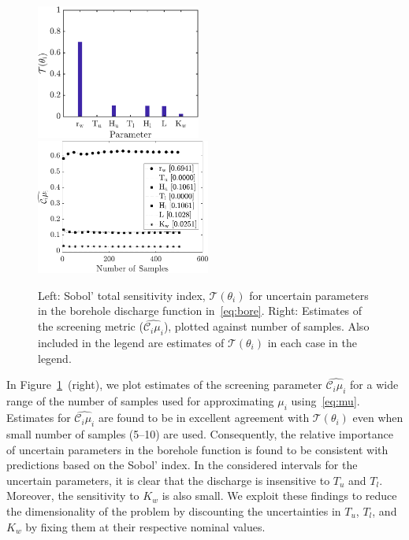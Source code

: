 \begin{figure}[htbp]
 \begin{center}
  \includegraphics[width=0.48\textwidth]{./Figures/sense_borehole}
  \includegraphics[width=0.51\textwidth]{./Figures/ub_conv_borehole}
\caption{
Left: Sobol' total sensitivity index, $\mathcal{T}(\theta_i)$ for uncertain
parameters in the
borehole discharge function in~\eqref{eq:bore}. Right: 
Estimates of the screening metric ($\widehat{\mathcal{C}_i\mu_i}$), plotted
against number of samples. Also included in the legend are estimates of
$\mathcal{T}(\theta_i)$ in each case in the legend.}
\label{fig:sense_bore}
\end{center}
\end{figure}

In Figure~\ref{fig:sense_bore}~(right), we plot estimates of the screening parameter 
$\widehat{\mathcal{C}_i\mu_i}$ for a wide range of the number of 
samples used for approximating $\mu_i$ using~\eqref{eq:mu}.
Estimates for $\widehat{\mathcal{C}_i\mu_i}$ are found to be in excellent agreement
with $\mathcal{T}(\theta_i)$ even when small number of samples (5--10) are used. 
Consequently, the relative importance of uncertain 
parameters in the borehole function is found to be consistent 
with predictions based on the Sobol' index. 
In the considered intervals for the uncertain parameters, it is clear 
that the discharge is insensitive to $T_u$ and $T_l$. 
Moreover, the sensitivity to $K_w$ is also small. We exploit these findings to reduce
the dimensionality of the problem by 
discounting the uncertainties in $T_u$, $T_l$, and $K_w$ by fixing 
them at their respective nominal values. 

